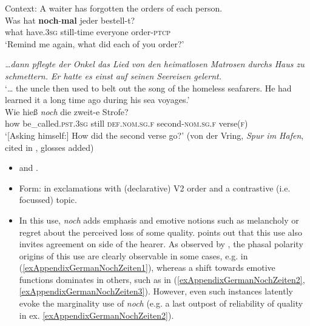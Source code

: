 \begin{exe}
	\ex\label{exAppendixGermanRemindMe1}
	Context: A waiter has forgotten the orders of each person.\\
	\gll Was hat \textbf{noch}-\textbf{mal} jeder bestell-t?\\
	what have.3\textsc{sg} still-time everyone order-\textsc{ptcp}\\
	\glt \lq Remind me again, what did each of you order?' \parencite[63]{Sauerland2009}	
	
	\ex\label{exAppendixGermanRemindMe2}
	\textit{…dann pflegte der Onkel das Lied von den heimatlosen Matrosen durchs Haus zu schmettern. Er hatte es einst auf seinen Seereisen gelernt.}\\
	\lq … the uncle then used to belt out the song of the homeless seafarers. He had learned it a long time ago during his sea voyages.\rq\\
	\gll Wie hieß \textit{noch} die zweit-e Strofe?\\
	how be\_called.\textsc{pst}.3\textsc{sg} still \textsc{def}.\textsc{nom}.\textsc{sg}.\textsc{f} second-\textsc{nom}.\textsc{sg}.\textsc{f} verse(\textsc{f})\\
	\glt \lq [Asking himself:] How did the second verse go?\rq{ }(von der Vring, \textit{Spur im Hafen}, cited in \cite[63]{Iwasaki1977}, glosses added) 
	

\end{exe}


\label{appendixGermanExclamations}
\begin{itemize}
	\item \textcite[s.v. \textit{noch}]{Duden} and \textcite[633–634]{MetrichFaucher2009}.
	\item Form: in exclamations with (declarative) V2 order and a contrastive (i.e. focussed) topic.
	\item In this use, \textit{noch} adds emphasis and emotive notions such as melancholy or regret about the perceived loss of some quality. \textcite[s.v. \textit{noch}]{Duden} points out that this use also invites agreement on side of the hearer. As observed by \textcite{MetrichFaucher2009}, the phasal polarity origins of this use are clearly observable in some cases, e.g. in (\ref{exAppendixGermanNochZeiten1}), whereas a shift towards emotive functions dominates in others, such as in (\ref{exAppendixGermanNochZeiten2}, \ref{exAppendixGermanNochZeiten3}). However, even such instances latently evoke the marginality use of \textit{noch} (e.g. a last outpost of reliability of quality in ex. \ref{exAppendixGermanNochZeiten2}).
\end{itemize}

